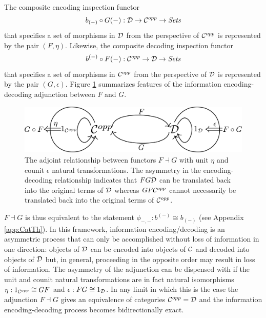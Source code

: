 \documentclass[aps,twocolumn]{revtex4-1}
\begin{document}
The composite encoding inspection functor 
$$
b_{(-)} \circ G(-): {\mathcal D} \rightarrow {\mathcal C}^{opp} \rightarrow \textit{Sets}
$$
that specifies a set of morphisms in ${\mathcal D}$ from the perspective of ${\mathcal C}^{opp}$ is represented by the pair $(F,\eta)$. Likewise, the composite decoding inspection functor 
$$
b^{(-)} \circ F(-): {\mathcal C}^{opp} \rightarrow {\mathcal D} \rightarrow \textit{Sets}
$$
that specifies a set of morphisms in ${\mathcal C}^{opp}$ from the perspective of ${\mathcal D}$ is represented by the pair $(G,\epsilon)$. Figure \ref{fig:adjunction} summarizes features of the information encoding-decoding adjunction between $F$ and $G$.

\begin{figure}
\noindent\includegraphics[width=0.9\columnwidth]{fig/adjunction.pdf}
\caption{The adjoint relationship between functors $F \dashv G$ with unit $\eta$ and counit $\epsilon$ natural transformations. The asymmetry in the encoding-decoding relationship indicates that $FG {\mathcal D}$ can be translated back into the original terms of ${\mathcal D}$ whereas $GF {\mathcal C}^{opp}$ cannot necessarily be translated back into the original terms of ${\mathcal C}^{opp}$.}
\label{fig:adjunction}
\end{figure}

$F \dashv G$ is thus equivalent to the statement $\phi_{-,-}:b^{(-)} \cong b_{(-)}$ (see Appendix \ref{app:CatTh}). In this framework, information encoding/decoding is an asymmetric process that can only be accomplished without loss of information in one direction: objects of ${\mathcal D}$ can be encoded into objects of ${\mathcal C}$ and decoded into objects of ${\mathcal D}$ but, in general, proceeding in the opposite order may result in loss of information. The asymmetry of the adjunction can be dispensed with if the unit and counit natural transformations are in fact natural isomorphisms $\eta: 1_{{\mathcal C}^{opp}} \cong GF$ and $\epsilon: FG \cong 1_{{\mathcal D}}$. In any limit in which this is the case the adjunction $F \dashv G$ gives an equivalence of categories ${\mathcal C}^{opp} = {\mathcal D}$ and the information encoding-decoding process becomes bidirectionally exact.

\end{document}

